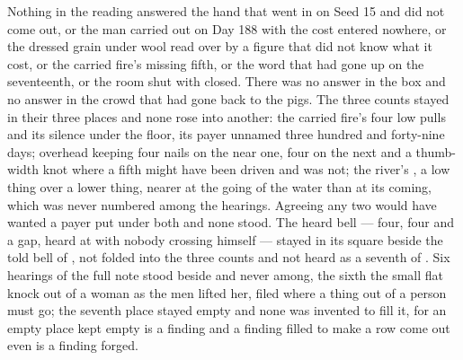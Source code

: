 Nothing in the reading answered the hand that went in on Seed 15 and did not come out, or the man carried out on Day 188 with the cost entered nowhere, or the dressed grain under wool read over by a figure that did not know what it cost, or the carried fire's missing fifth, or the word that had gone up  on the seventeenth, or the room shut with  closed. There was no answer in the box and no answer in the crowd that had gone back to the pigs. The three counts stayed in their three places and none rose into another: the carried fire's four low pulls and its silence under the floor, its payer unnamed three hundred and forty-nine days; overhead  keeping four nails on the near one, four on the next and a thumb-width knot where a fifth might have been driven and was not; the river's , a low thing over a lower thing, nearer at the going of the water than at its coming, which was never numbered among the hearings. Agreeing any two would have wanted a payer put under both and none stood. The heard bell --- four, four and a gap, heard at  with nobody crossing himself --- stayed in its square beside the told bell of , not folded into the three counts and not heard as a seventh of . Six hearings of the full note stood beside and never among, the sixth the small flat knock out of a woman as the men lifted her, filed where a thing out of a person must go; the seventh place stayed empty and none was invented to fill it, for an empty place kept empty is a finding and a finding filled to make a row come out even is a finding forged.

\scenebreak

